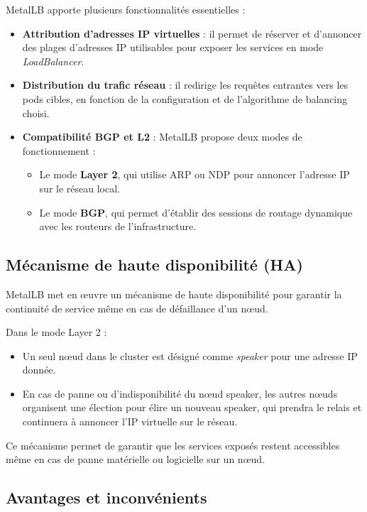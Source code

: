 MetalLB apporte plusieurs fonctionnalités essentielles :
\begin{itemize}
	\item \textbf{Attribution d’adresses IP virtuelles} : il permet de réserver et d’annoncer des plages d’adresses IP utilisables pour exposer les services en mode \emph{LoadBalancer}.
	\item \textbf{Distribution du trafic réseau} : il redirige les requêtes entrantes vers les pods cibles, en fonction de la configuration et de l’algorithme de balancing choisi.
	\item \textbf{Compatibilité BGP et L2} : MetalLB propose deux modes de fonctionnement :
	      \begin{itemize}
		      \item Le mode \textbf{Layer 2}, qui utilise ARP ou NDP pour annoncer l’adresse IP sur le réseau local.
		      \item Le mode \textbf{BGP}, qui permet d’établir des sessions de routage dynamique avec les routeurs de l’infrastructure.
	      \end{itemize}
\end{itemize}

\subsection{Mécanisme de haute disponibilité (HA)}

MetalLB met en œuvre un mécanisme de haute disponibilité pour garantir la continuité de service même en cas de défaillance d’un nœud.

Dans le mode Layer 2 :
\begin{itemize}
	\item Un seul nœud dans le cluster est désigné comme \emph{speaker} pour une adresse IP donnée.
	\item En cas de panne ou d’indisponibilité du nœud speaker, les autres nœuds organisent une élection pour élire un nouveau speaker, qui prendra le relais et continuera à annoncer l’IP virtuelle sur le réseau.
\end{itemize}

Ce mécanisme permet de garantir que les services exposés restent accessibles même en cas de panne matérielle ou logicielle sur un nœud.

\subsection{Avantages et inconvénients}


